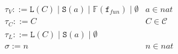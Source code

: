 \documentclass{article}
\begin{document}
\begin{figure}
    \begin{minipage}{0.55\textwidth}
\[\begin{aligned}
  & \tau_V ::= \mathtt{L}(C) \mid \mathtt{S}(a) \mid \mathbb{F}(\mathtt{f}_{fun}) \mid \emptyset & a \in \mathit{nat} \\
  & \tau_C ::= C & C \in \mathcal{C} \\
  & \tau_L ::= \mathtt{L}(C) \mid \mathtt{S}(a) \mid \emptyset \\
  & \sigma := n & n \in \mathit{nat} \\
  \end{aligned}\]
  \end{minipage}
  \begin{minipage}{0.4\textwidth}
    

\end{minipage}
\end{figure}
\end{document}
